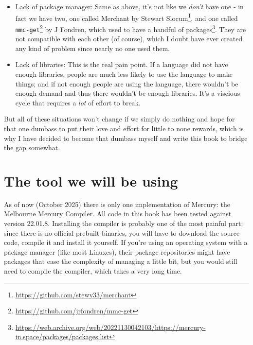 \begin{itemize}
\begin{itemize}
    \end{itemize}
\item Lack of package manager: Same as above, it's not like we \textit{don't} have one - in fact we have two, one called Merchant by Stewart Slocum\footnote{\url{https://github.com/stewy33/merchant}}, and one called \texttt{mmc-get}\footnote{\url{https://github.com/jrfondren/mmc-get}} by J Fondren, which used to have a handful of packages\footnote{\url{https://web.archive.org/web/20221130042103/https://mercury-in.space/packages/packages.list}}. They are not compatible with each other (of course), which I doubt have ever created any kind of problem since nearly no one used them. 
\item Lack of libraries: This is the real pain point. If a language did not have enough libraries, people are much less likely to use the language to make things; and if not enough people are using the language, there wouldn't be enough demand and thus there wouldn't be enough libraries. It's a viscious cycle that requires a \textit{lot} of effort to break.
  
\end{itemize}

But all of these situations won't change if we simply do nothing and hope for that one dumbass to put their love and effort for little to none rewards, which is why I have decided to become that dumbass myself and write this book to bridge the gap somewhat.


\section{The tool we will be using}

As of now (October 2025) there is only one implementation of Mercury: the Melbourne Mercury Compiler. All code in this book has been tested against version 22.01.8. Installing the compiler is probably one of the most painful part: since there is no official prebuilt binaries, you will have to download the source code, compile it and install it yourself. If you're using an operating system with a package manager (like most Linuxes), their package repositories might have packages that ease the complexity of managing a little bit, but you would still need to compile the compiler, which takes a very long time.



